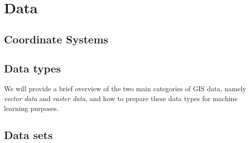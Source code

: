 \section{Data}%
\label{sec:data}



\subsection{Coordinate Systems}%
\label{sec:coordinate-systems}


\subsection{Data types}%
\label{sec:data-types}

We will provide a brief overview of the two main categories of GIS data, namely \textit{vector data} and \textit{raster data}, and how to prepare these data types for machine learning purposes.



%
\label{sec:raster-data}


\subsection{Data sets}%
\label{sec:data-sets}




